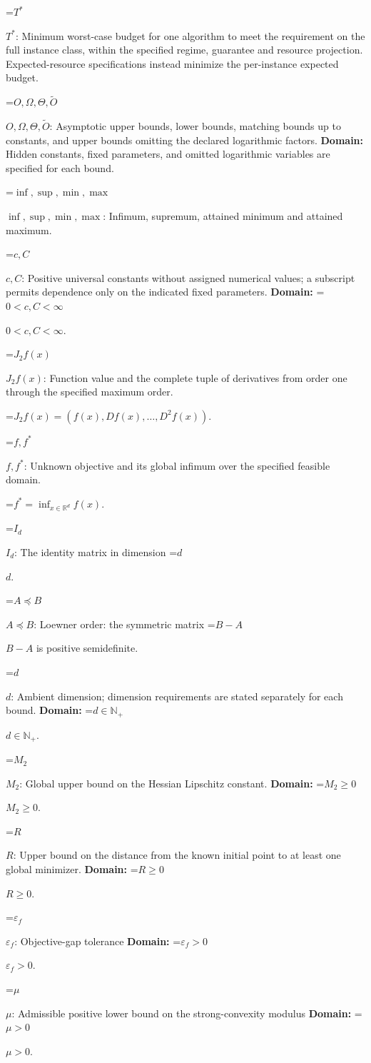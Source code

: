 \documentclass[10pt,a4paper]{article}
\newcommand{\AtlasMath}[1]{\par\begingroup\centering\setbox0=\hbox{$\displaystyle #1$}\ifdim\wd0>1.4\linewidth\typeout{ATLAS WIDE FORMULA: \the\wd0}\fi\ifdim\wd0>\linewidth\resizebox{\linewidth}{!}{\box0}\else\box0\fi\par\endgroup}
\newcommand{\AtlasInlineMath}[1]{\begingroup\setbox0=\hbox{$#1$}\ifdim\wd0>.4\linewidth\endgroup\AtlasMath{#1}\else\endgroup$#1$\fi}
\begin{document}
\AtlasInlineMath{T^*}: Minimum worst-case budget for one algorithm to meet the requirement on the full instance class, within the specified regime, guarantee and resource projection. Expected-resource specifications instead minimize the per-instance expected budget.

\AtlasInlineMath{O,\Omega,\Theta,\widetilde{O}}: Asymptotic upper bounds, lower bounds, matching bounds up to constants, and upper bounds omitting the declared logarithmic factors. \textbf{Domain:} Hidden constants, fixed parameters, and omitted logarithmic variables are specified for each bound.

\AtlasInlineMath{\inf,\sup,\min,\max}: Infimum, supremum, attained minimum and attained maximum.

\AtlasInlineMath{c,C}: Positive universal constants without assigned numerical values; a subscript permits dependence only on the indicated fixed parameters. \textbf{Domain:} \AtlasInlineMath{0<c,C<\infty}.

\AtlasInlineMath{J_{2}f(x)}: Function value and the complete tuple of derivatives from order one through the specified maximum order.


\AtlasMath{J_{2}f(x)=(f(x),Df(x),\ldots,D^{2}f(x)).}


\AtlasInlineMath{f,f^*}: Unknown objective and its global infimum over the specified feasible domain.


\AtlasMath{f^*=\inf_{x\in \mathbb{R}^d}f(x).}


\AtlasInlineMath{I_d}: The identity matrix in dimension \AtlasInlineMath{d}.

\AtlasInlineMath{A\preceq B}: Loewner order: the symmetric matrix \AtlasInlineMath{B-A} is positive semidefinite.

\AtlasInlineMath{d}: Ambient dimension; dimension requirements are stated separately for each bound. \textbf{Domain:} \AtlasInlineMath{d\in\mathbb{N}_{+}}.

\AtlasInlineMath{M_2}: Global upper bound on the Hessian Lipschitz constant. \textbf{Domain:} \AtlasInlineMath{M_2\ge0}.

\AtlasInlineMath{R}: Upper bound on the distance from the known initial point to at least one global minimizer. \textbf{Domain:} \AtlasInlineMath{R\ge0}.

\AtlasInlineMath{\varepsilon_f}: Objective-gap tolerance \textbf{Domain:} \AtlasInlineMath{\varepsilon_f>0}.

\AtlasInlineMath{\mu}: Admissible positive lower bound on the strong-convexity modulus \textbf{Domain:} \AtlasInlineMath{\mu>0}.
\end{document}
